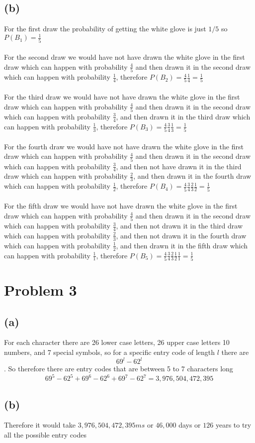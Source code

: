 \subsection*{(b)}
For the first draw the probability of getting the white glove is
just $1/5$ so $P(B_1)=\frac{1}{5}$\\\\
For the second draw we would have not have drawn the white glove in the
first draw which can happen with probability $\frac{4}{5}$ and 
then drawn it in the second draw which can happen with probability $\frac{1}{4}$,
therefore $P(B_2)=\frac{4}{5}\frac{1}{4}=\boxed{\frac{1}{5}}$\\\\
For the third draw we would have not have drawn the white glove in the
first draw which can happen with probability $\frac{4}{5}$ and 
then drawn it in the second draw which can happen with probability $\frac{3}{4}$,
and then drawn it in the third draw which can happen with probability $\frac{1}{3}$,
therefore $P(B_3)=\frac{4}{5}\frac{3}{4}\frac{1}{3}=\boxed{\frac{1}{5}}$\\\\
For the fourth draw we would have not have drawn the white glove in the
first draw which can happen with probability $\frac{4}{5}$ and 
then drawn it in the second draw which can happen with probability $\frac{3}{4}$,
and then not have drawn it in the third draw which can happen with probability $\frac{2}{3}$,
and then drawn it in the fourth draw which can happen with probability $\frac{1}{2}$,
therefore $P(B_4)=\frac{4}{5}\frac{3}{4}\frac{2}{3}\frac{1}{2}=\boxed{\frac{1}{5}}$\\\\
For the fifth draw we would have not have drawn the white glove in the
first draw which can happen with probability $\frac{4}{5}$ and 
then drawn it in the second draw which can happen with probability $\frac{3}{4}$,
and then not drawn it in the third draw which can happen with probability $\frac{2}{3}$,
and then not drawn it in the fourth draw which can happen with probability $\frac{1}{2}$,
and then drawn it in the fifth draw which can happen with probability $\frac{1}{1}$,
therefore $P(B_5)=\frac{4}{5}\frac{3}{4}\frac{2}{3}\frac{1}{2}\frac{1}{1}=\boxed{\frac{1}{5}}$
\section*{Problem 3}
\subsection*{(a)}
For each character there are 26 lower case letters, 26 upper case letters
10 numbers, and 7 special symbols, so
for a specific entry code of length $l$ there are 
$$69^l-62^l$$. 
So therefore there are entry codes that are between 5 to 7 characters long
$$69^5-62^5+69^6-62^6+69^7-62^7=\boxed{3,976,504,472,395}$$
\subsection*{(b)}
Therefore it would take  $3,976,504,472,395ms$ or $46,000$ days or $\boxed{126}$ years to try all the possible entry codes

